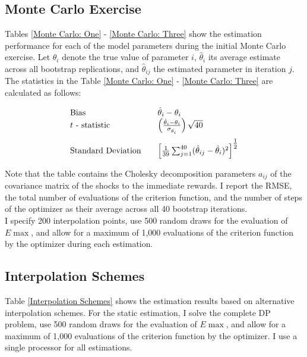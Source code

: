 \subsection{Monte Carlo Exercise}
Tables \ref{Monte Carlo: One} - \ref{Monte Carlo: Three} show the estimation performance for each of the model parameters during the initial Monte Carlo exercise. Let $\theta_i$ denote the true value of parameter $i$, $\hat{\theta}_i$ its average estimate across all bootstrap replications, and $\hat{\theta}_{ij}$ the estimated parameter in iteration $j$. The statistics in the Table \ref{Monte Carlo: One} - \ref{Monte Carlo: Three} are calculated as follows:

\renewcommand\arraystretch{2}
\begin{align*}\begin{array}{l@{\qquad}l}
\text{Bias} & \hat{\theta}_i - \theta_i\\\medskip
\text{$t$ - statistic} & \left(\frac{\hat{\theta}_i - \theta_i}{\sigma_{\hat{\theta_i}}}\right) \sqrt{40} \\
\text{Standard Deviation} & \left[ \frac{1}{39} \sum^{40}_{j = 1} (\hat{\theta}_{ij} - \hat{\theta}_i)^2
\right]^{\tfrac{1}{2}}
\end{array}
\end{align*}
\renewcommand\arraystretch{1}

Note that the table contains the Cholesky decomposition parameters $a_{ij}$ of the covariance matrix of the shocks to the immediate rewards. I report the RMSE, the total number of evaluations of the criterion function, and the number of steps of the optimizer as their average across all 40 bootstrap iterations.\\\newline
%
I specify 200 interpolation points, use 500 random draws for the evaluation of $E\max$, and allow for a maximum of 1,000 evaluations of the criterion function by the optimizer during each estimation.\clearpage



\clearpage
\subsection{Interpolation Schemes}
Table \ref{Interpolation Schemes} shows the estimation results based on alternative interpolation schemes. For the static estimation, I solve the complete DP problem, use 500 random draws for the evaluation of $E\max$, and allow for a maximum of 1,000 evaluations of the criterion function by the optimizer. I use a single processor for all estimations.
